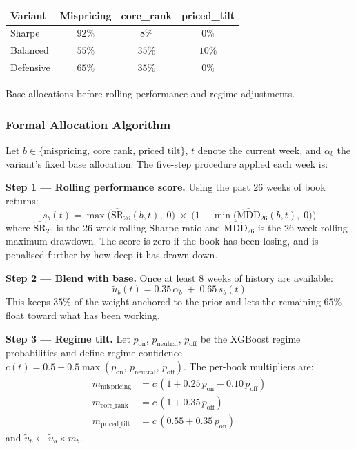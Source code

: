 \documentclass[11pt,a4paper]{article}
\begin{document}
\begin{center}
\small
\begin{tabular}{lccc}
\toprule
\rowcolor{tablehead}
\textbf{Variant} & \textbf{Mispricing} & \textbf{core\_rank} & \textbf{priced\_tilt} \\
\midrule
Sharpe & $92\%$ & $8\%$ & $0\%$ \\
Balanced & $55\%$ & $35\%$ & $10\%$ \\
Defensive & $65\%$ & $35\%$ & $0\%$ \\
\bottomrule
\end{tabular}
\end{center}
\smallskip
{\small Base allocations before rolling-performance and regime adjustments.}

\subsubsection*{Formal Allocation Algorithm}

Let $b \in \{\text{mispricing},\, \text{core\_rank},\, \text{priced\_tilt}\}$, $t$ denote the current week, and $\alpha_b$ the variant's fixed base allocation. The five-step procedure applied each week is:

\textbf{Step 1 — Rolling performance score.} Using the past 26 weeks of book returns:
\begin{equation*}
  s_b(t) = \max\!\bigl(\widehat{\mathrm{SR}}_{26}(b,t),\;0\bigr)\;\times\;\bigl(1 + \min\!\bigl(\widehat{\mathrm{MDD}}_{26}(b,t),\;0\bigr)\bigr)
\end{equation*}
where $\widehat{\mathrm{SR}}_{26}$ is the 26-week rolling Sharpe ratio and $\widehat{\mathrm{MDD}}_{26}$ is the 26-week rolling maximum drawdown. The score is zero if the book has been losing, and is penalised further by how deep it has drawn down.

\textbf{Step 2 — Blend with base.} Once at least 8 weeks of history are available:
\begin{equation*}
  \tilde{u}_b(t) = 0.35\,\alpha_b \;+\; 0.65\,s_b(t)
\end{equation*}
This keeps $35\%$ of the weight anchored to the prior and lets the remaining $65\%$ float toward what has been working.

\textbf{Step 3 — Regime tilt.} Let $p_{\mathrm{on}}$, $p_{\mathrm{neutral}}$, $p_{\mathrm{off}}$ be the XGBoost regime probabilities and define regime confidence $c(t) = 0.5 + 0.5\max(p_{\mathrm{on}},\,p_{\mathrm{neutral}},\,p_{\mathrm{off}})$. The per-book multipliers are:
\begin{align*}
  m_{\text{mispricing}}  &= c\,(1 + 0.25\,p_{\mathrm{on}} - 0.10\,p_{\mathrm{off}}) \\
  m_{\text{core\_rank}}  &= c\,(1 + 0.35\,p_{\mathrm{off}}) \\
  m_{\text{priced\_tilt}}&= c\,(0.55 + 0.35\,p_{\mathrm{on}})
\end{align*}
and $\tilde{u}_b \leftarrow \tilde{u}_b \times m_b$.
\end{document}

